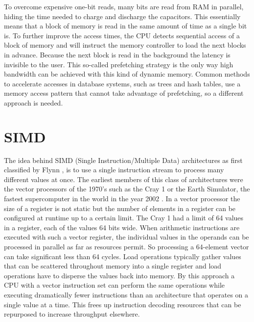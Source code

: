 To overcome expensive one-bit reads, many bits are read from RAM in parallel,
hiding the time needed to charge and discharge the capacitors. This essentially
means that a block of memory is read in the same amount of time as a single bit
is. To further improve the access times, the CPU detects sequential access of a
block of memory and will instruct the memory controller to load the next blocks
in advance. Because the next block is read in the background the latency is
invisible to the user. This so-called prefetching strategy is the only way high
bandwidth can be achieved with this kind of dynamic memory. Common methods to
accelerate accesses in database systems, such as trees and hash tables, use a
memory access pattern that cannot take advantage of prefetching, so a different
approach is needed.

\section{SIMD}

The idea behind SIMD (Single Instruction/Multiple Data) architectures as
first classified by Flynn \cite{flynnsimd}, is to use a single instruction
stream to process many different values at once. The earliest members of this
class of architectures were the vector processors of the 1970's such as the
Cray 1 or the Earth Simulator, the fastest supercomputer in the world in the year
2002 \cite{hennessyarch}. In a vector processor the size of a register is not
static but the number of elements in a register can be configured at runtime up
to a certain limit. The Cray 1 had a limit of 64 values in a register, each of
the values 64 bits wide. When arithmetic instructions are executed with such a
vector register, the individual values in the operands can be processed in
parallel as far as resources permit. So processing a 64-element vector can take
significant less than 64 cycles. Load operations typically gather values that
can be scattered throughout memory into a single register and load operations
have to disperse the values back into memory. By this approach a CPU with a vector
instruction set can perform the same operations while executing dramatically
fewer instructions than an architecture that operates on a single value at a
time. This frees up instruction decoding resources that can be repurposed to
increase throughput elsewhere.

